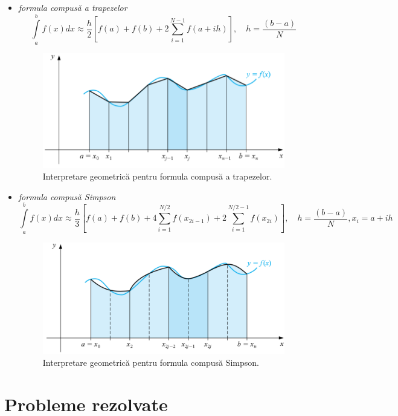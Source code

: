 \documentclass{exam}
\begin{document}
\begin{itemize}
	\item \textit{formula compus\u{a} a trapezelor}
	      $$\int\limits_{a}^{b}f(x)dx\approx\frac{h}{2}\left[f(a)+f(b)+2\sum\limits_{i=1}^{N-1}f(a+ih)\right], \quad h = \frac{(b-a)}{N}$$

	      \begin{figure}[ht]

		      \begin{center}
			      \includegraphics[width=0.5\columnwidth]{./img/c_trapez}
			      \caption{Interpretare geometrică pentru formula  compus\u{a} a trapezelor.}
		      \end{center}
	      \end{figure}

	\item \textit{formula compus\u{a} Simpson}
	      $$\int\limits_{a}^{b}f(x)dx\approx\frac{h}{3}\left[f(a)+f(b)+4\sum\limits_{i=1}^{N/2}f(x_{2i-1})+2\sum\limits_{i=1}^{N/2-1}f(x_{2i})\right], \quad h = \frac{(b-a)}{N}, x_i=a+ih$$

	      \begin{figure}[ht]

		      \begin{center}
			      \includegraphics[width=0.5\columnwidth]{./img/c_simpson}
			      \caption{Interpretare geometrică pentru formula compus\u{a} Simpson.}
		      \end{center}
	      \end{figure}

\end{itemize}


\section{Probleme rezolvate}
\end{document}
